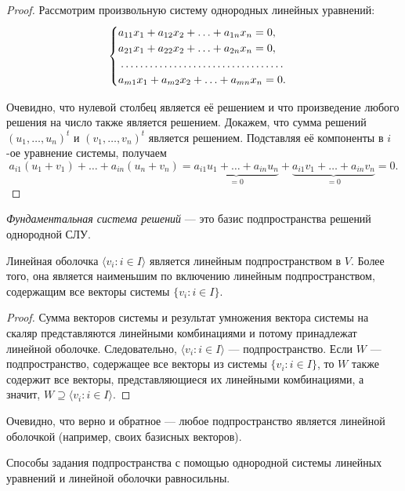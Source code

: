 \begin{proof}
    Рассмотрим произвольную систему однородных линейных уравнений:
    \[
        \begin{cases}
            a_{11}x_1 + a_{12}x_2 + \ldots + a_{1n}x_n = 0,\\
            a_{21}x_1 + a_{22}x_2 + \ldots + a_{2n}x_n = 0,\\
            \dotfill\\
            a_{m1}x_1 + a_{m2}x_2 + \ldots + a_{mn}x_n = 0.\\
        \end{cases}
    \]

    Очевидно, что нулевой столбец является её решением и что произведение любого решения на число также является решением. Докажем, что сумма решений $(u_1, \ldots, u_n)^t$ и $(v_1, \ldots, v_n)^t$ является решением. Подставляя её компоненты в $i$-ое уравнение системы, получаем
    \[
        a_{i1}(u_1 + v_1) + \ldots + a_{in}(u_n + v_n) = \underbrace{a_{i1}u_1 + \ldots + a_{in}u_n}_{= 0} + \underbrace{a_{i1}v_1 + \ldots + a_{in}v_n}_{= 0} = 0.
    \]
\end{proof}

\begin{definition}
    \textit{Фундаментальная система решений} --- это базис подпространства решений однородной СЛУ.
\end{definition}

\begin{proposal}
    Линейная оболочка $\langle v_i : i \in I \rangle$ является линейным подпространством в $V$. Более того, она является наименьшим по включению линейным подпространством, содержащим все векторы системы $\{v_i : i \in I\}$.
\end{proposal}

\begin{proof}
    Сумма векторов системы и результат умножения вектора системы на скаляр представляются линейными комбинациями и потому принадлежат линейной оболочке. Следовательно, $\langle v_i : i \in I\rangle$ --- подпространство. Если $W$ --- подпространство, содержащее все векторы из системы $\{v_i : i \in I\}$, то $W$ также содержит все векторы, представляющиеся их линейными комбинациями, а значит, $W \supseteq \langle v_i : i \in I\rangle$.
\end{proof}

Очевидно, что верно и обратное --- любое подпространство является линейной оболочкой (например, своих базисных векторов).

\begin{theorem}
    Способы задания подпространства с помощью однородной системы линейных уравнений и линейной оболочки равносильны.
\end{theorem}


